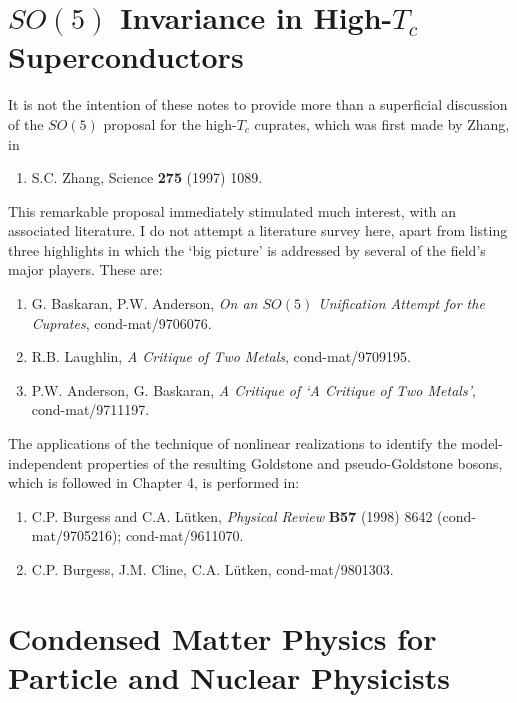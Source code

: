 \documentclass[12pt,epsf]{report}
\begin{document}
\section{$SO(5)$ Invariance in High-$T_c$ Superconductors}

It is not the intention of these notes to provide more than
a superficial discussion of the $SO(5)$ proposal for the
high-$T_c$ cuprates, which was first made by Zhang, in

\begin{enumerate}
\item
S.C. Zhang, Science {\bf 275} (1997) 1089.
\end{enumerate}

\bigskip\noindent
This remarkable proposal immediately stimulated much
interest, with an associated literature. I do not attempt a
literature survey here, apart from listing three highlights
in which the `big picture' is addressed by several of the
field's major players. These are:

\begin{enumerate}

\item
 G. Baskaran, P.W. Anderson, {\sl On an $SO(5)$ Unification
Attempt for the Cuprates}, cond-mat/9706076.

\item
R.B. Laughlin, {\sl A Critique of Two Metals},
cond-mat/9709195.

\item
P.W. Anderson, G. Baskaran, {\sl A Critique of `A Critique
of Two Metals'}, cond-mat/9711197.

\end{enumerate}


\bigskip
The applications of the technique of nonlinear realizations
to identify the model-independent properties of the
resulting Goldstone and pseudo-Goldstone bosons, which is
followed in Chapter 4, is performed in:

\begin{enumerate}
\item
C.P. Burgess and C.A. L\"utken, {\it Physical Review} {\bf
B57} (1998) 8642 (cond-mat/9705216);  cond-mat/9611070.

\item
C.P. Burgess, J.M. Cline, C.A. L\"utken, cond-mat/9801303.

\end{enumerate}


\section{Condensed Matter Physics for Particle and Nuclear
Physicists}
\end{document}
